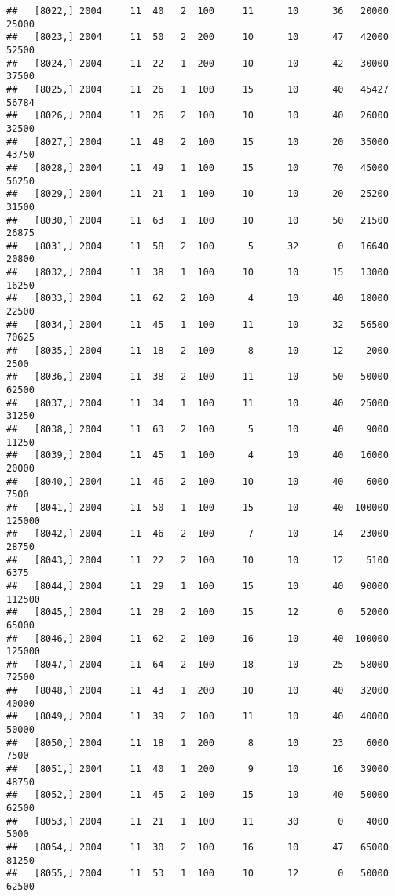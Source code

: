 \documentclass{article}\usepackage[]{graphicx}\usepackage[]{color}
\makeatletter
\newenvironment{kframe}{%
 \def\at@end@of@kframe{}%
 \ifinner\ifhmode%
  \def\at@end@of@kframe{\end{minipage}}%
  \begin{minipage}{\columnwidth}%
 \fi\fi%
 \def\FrameCommand##1{\hskip\@totalleftmargin \hskip-\fboxsep
 \colorbox{shadecolor}{##1}\hskip-\fboxsep
     \hskip-\linewidth \hskip-\@totalleftmargin \hskip\columnwidth}%
 \MakeFramed {\advance\hsize-\width
   \@totalleftmargin\z@ \linewidth\hsize
   \@setminipage}}%
 {\par\unskip\endMakeFramed%
 \at@end@of@kframe}
\newenvironment{knitrout}{}{} %
\makeatother
\begin{document}
\begin{knitrout}
\begin{kframe}
\begin{verbatim}
##   [8022,] 2004     11  40   2  100     11      10      36   20000   25000
##   [8023,] 2004     11  50   2  200     10      10      47   42000   52500
##   [8024,] 2004     11  22   1  200     10      10      42   30000   37500
##   [8025,] 2004     11  26   1  100     15      10      40   45427   56784
##   [8026,] 2004     11  26   2  100     10      10      40   26000   32500
##   [8027,] 2004     11  48   2  100     15      10      20   35000   43750
##   [8028,] 2004     11  49   1  100     15      10      70   45000   56250
##   [8029,] 2004     11  21   1  100     10      10      20   25200   31500
##   [8030,] 2004     11  63   1  100     10      10      50   21500   26875
##   [8031,] 2004     11  58   2  100      5      32       0   16640   20800
##   [8032,] 2004     11  38   1  100     10      10      15   13000   16250
##   [8033,] 2004     11  62   2  100      4      10      40   18000   22500
##   [8034,] 2004     11  45   1  100     11      10      32   56500   70625
##   [8035,] 2004     11  18   2  100      8      10      12    2000    2500
##   [8036,] 2004     11  38   2  100     11      10      50   50000   62500
##   [8037,] 2004     11  34   1  100     11      10      40   25000   31250
##   [8038,] 2004     11  63   2  100      5      10      40    9000   11250
##   [8039,] 2004     11  45   1  100      4      10      40   16000   20000
##   [8040,] 2004     11  46   2  100     10      10      40    6000    7500
##   [8041,] 2004     11  50   1  100     15      10      40  100000  125000
##   [8042,] 2004     11  46   2  100      7      10      14   23000   28750
##   [8043,] 2004     11  22   2  100     10      10      12    5100    6375
##   [8044,] 2004     11  29   1  100     15      10      40   90000  112500
##   [8045,] 2004     11  28   2  100     15      12       0   52000   65000
##   [8046,] 2004     11  62   2  100     16      10      40  100000  125000
##   [8047,] 2004     11  64   2  100     18      10      25   58000   72500
##   [8048,] 2004     11  43   1  200     10      10      40   32000   40000
##   [8049,] 2004     11  39   2  100     11      10      40   40000   50000
##   [8050,] 2004     11  18   1  200      8      10      23    6000    7500
##   [8051,] 2004     11  40   1  200      9      10      16   39000   48750
##   [8052,] 2004     11  45   2  100     15      10      40   50000   62500
##   [8053,] 2004     11  21   1  100     11      30       0    4000    5000
##   [8054,] 2004     11  30   2  100     16      10      47   65000   81250
##   [8055,] 2004     11  53   1  100     10      12       0   50000   62500

\end{verbatim}
\end{kframe}
\end{knitrout}
\end{document}
